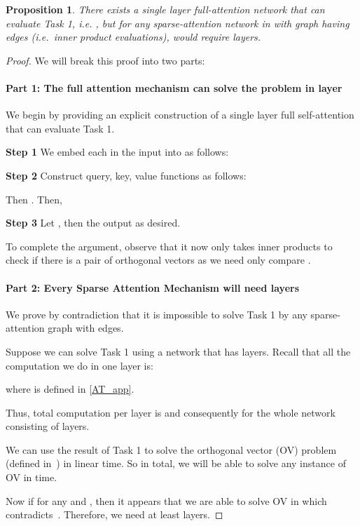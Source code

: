 \documentclass{article}
\newtheorem{proposition}{Proposition}
\begin{document}
\begin{proposition}
    There exists a single layer full-attention network  that can 
    evaluate Task 1,  i.e. , but for any sparse-attention network in  with
    graph  having  edges (i.e.~inner product evaluations), would require  layers.
\end{proposition}
\begin{proof}
We will break this proof into two parts:
\paragraph{Part 1: The full attention mechanism can solve the problem in  layer}
We begin by providing an explicit construction of a single layer full self-attention that can evaluate Task 1.

\textbf{Step 1} 
We embed each  in the input into  as follows:


\textbf{Step 2}
Construct query, key, value functions as follows:


Then . Then,


\textbf{Step 3} 
Let , then the output  as desired.

To complete the argument, observe that it now only takes  inner products to check
if there is a pair of orthogonal vectors as we need only compare . 

\paragraph{Part 2: Every Sparse Attention Mechanism will need  layers}
    We prove by contradiction that it is impossible to solve Task 1 by any 
     sparse-attention graph  with  edges.

    Suppose we can solve Task 1 using a network  that has 
     layers. Recall that all the computation we do in one layer is:
    
    where  is defined in \cref{AT_app}.

    Thus, total computation per layer is  and consequently  for the 
    whole network consisting of  layers.
    
    We can use the result of Task 1 to solve the orthogonal vector (OV) problem (defined 
    in~) in linear time. So in total, we will be able to solve any instance of OV in  time.
    
    Now if  for any  and , then it 
    appears that we are able to solve OV in  which contradicts~.
    Therefore, we need at least  layers.
\end{proof}
\end{document}

